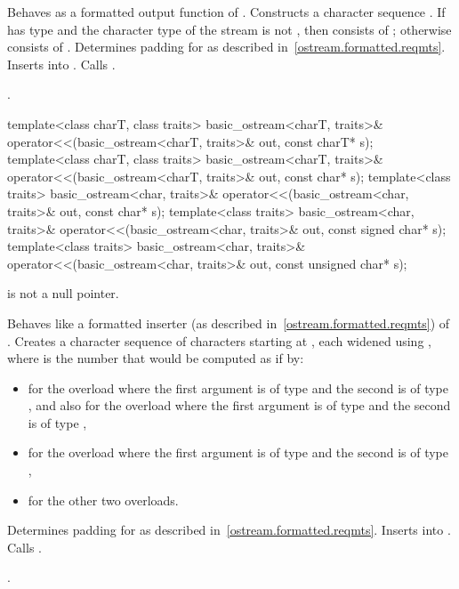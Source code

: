 \begin{itemdescr}
\pnum
\effects
Behaves as a formatted output function
of . Constructs a character sequence .
If  has type
and the character type of the stream is not
,
then  consists of
;
otherwise  consists of
. Determines padding for  as described
in~\ref{ostream.formatted.reqmts}. Inserts  into
. Calls .

\pnum
\returns
{}.
\end{itemdescr}

%
\begin{itemdecl}
template<class charT, class traits>
  basic_ostream<charT, traits>& operator<<(basic_ostream<charT, traits>& out, const charT* s);
template<class charT, class traits>
  basic_ostream<charT, traits>& operator<<(basic_ostream<charT, traits>& out, const char* s);
template<class traits>
  basic_ostream<char, traits>& operator<<(basic_ostream<char, traits>& out, const char* s);
template<class traits>
  basic_ostream<char, traits>& operator<<(basic_ostream<char, traits>& out, const signed char* s);
template<class traits>
  basic_ostream<char, traits>& operator<<(basic_ostream<char, traits>& out,
                                          const unsigned char* s);
\end{itemdecl}

\begin{itemdescr}
\pnum
\expects
{} is not a null pointer.

\pnum
\effects
Behaves like a formatted inserter (as described in~\ref{ostream.formatted.reqmts}) of .
Creates a character sequence  of  characters
starting at , each widened using
,
where  is the number that would be computed as if by:
\begin{itemize}
\item
{}
for the overload where the first argument is of type
and the second is of type
,
and also for the overload where the first argument is of type
and the second is of type
,
\item
{}
for the overload where the first argument is of type
and the second is of type
,
\item
{}
for the other two overloads.
\end{itemize}
Determines padding for  as described
in~\ref{ostream.formatted.reqmts}. Inserts  into
. Calls .

\pnum
\returns
{}.
\end{itemdescr}

